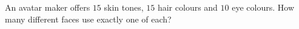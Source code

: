 An avatar maker offers $15$ skin tones, $15$ hair colours and $10$ eye colours. How many different faces use exactly one of each?

